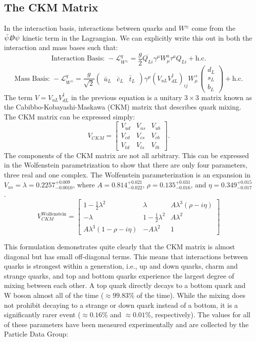 \subsection{The CKM Matrix}
\label{sec:CKM}
In the interaction basis, interactions between quarks and $W^\pm$ come from the $\bar{\psi}\slashed{D}\psi$ kinetic term in the Lagrangian.  We can explicitly write this out in both the interaction and mass bases such that:
\[\text{Interaction Basis: } -\mathcal{L}^q_{W^\pm} =\frac{g}{2}\overline{Q_{Li}}\gamma^{\mu}W_{\mu}^a\tau^a Q_{Li} +\text{h.c.}\]
\[\text{Mass Basis: } -\mathcal{L}^q_{W^\pm} =\frac{g}{\sqrt{2}}\begin{pmatrix}\bar{u}_L &\bar{c}_L &\bar{t}_L\end{pmatrix}\gamma^\mu (V_{uL}V_{dL}^{\dagger})_{ij}W_{\mu}^+ \begin{pmatrix} d_L \\s_L \\b_L\end{pmatrix}+\text{h.c.} \]
The term $V=V_{uL}V_{dL}^{\dagger}$ in the previous equation is a unitary $3\times3$ matrix known as the Cabibbo-Kobayashi-Maskawa (CKM) matrix \cite{CKM1,CKM2} that describes quark mixing.  The CKM matrix can be expressed simply:
\[
V_{CKM} = 
\begin{bmatrix}
V_{ud} & V_{us} & V_{ub} \\
V_{cd} & V_{cs} & V_{cb} \\
V_{td} & V_{ts} & V_{tb}
\end{bmatrix}.
\]
The components of the CKM matrix are not all arbitrary.  This can be expressed in the Wolfenstein parametrization\cite{Wolfenstein} to show that there are only four parameters, three real and one complex.  The Wolfenstein parameterization is an expansion in $V_{us}=\lambda= 0.2257^{+0.009}_{-0.0010}$, where $A=0.814^{+0.021}_{-0.022}$, $\rho=0.135^{+0.031}_{-0.016}$, and $\eta = 0.349^{+0.015}_{-0.017}$ \cite{PDG2018}.
\[
V_{CKM}^\text{Wolfenstein} = 
\begin{bmatrix}
1-\frac{1}{2}\lambda^2 	& \lambda			  & A \lambda^3(\rho - i \eta) \\
-\lambda 			& 1-\frac{1}{2}\lambda^2	  & A\lambda^2 \\
A\lambda^3(1-\rho -i\eta) & -A \lambda^2		 & 1
\end{bmatrix}
\]

This formulation demonstrates quite clearly that the CKM matrix is almost diagonal but has small off-diagonal terms.  This means that interactions between quarks is strongest within a generation, i.e., up and down quarks, charm and strange quarks, and top and bottom quarks experience the largest degree of mixing between each other.  A top quark directly decays to a bottom quark and W boson almost all of the time ($\approx 99.83\%$ of the time).  While the mixing does not prohibit decaying to a strange or down quark instead of a bottom, it is a significantly rarer event ($\approx 0.16\%$ and $\approx 0.01\%$, respectively).  The values for all of these parameters have been measured experimentally and are collected by the Particle Data Group\cite{PDG2018}: 

